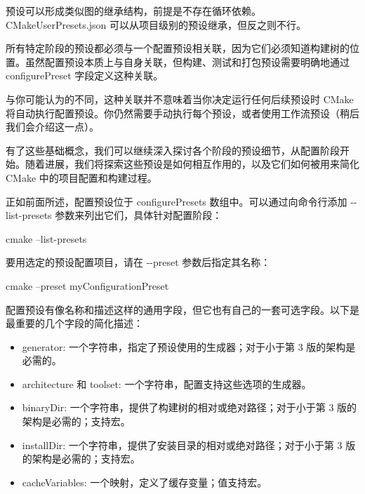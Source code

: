 预设可以形成类似图的继承结构，前提是不存在循环依赖。CMakeUserPresets.json 可以从项目级别的预设继承，但反之则不行。


所有特定阶段的预设都必须与一个配置预设相关联，因为它们必须知道构建树的位置。虽然配置预设本质上与自身关联，但构建、测试和打包预设需要明确地通过 configurePreset 字段定义这种关联。

与你可能认为的不同，这种关联并不意味着当你决定运行任何后续预设时 CMake 将自动执行配置预设。你仍然需要手动执行每个预设，或者使用工作流预设（稍后我们会介绍这一点）。

有了这些基础概念，我们可以继续深入探讨各个阶段的预设细节，从配置阶段开始。随着进展，我们将探索这些预设是如何相互作用的，以及它们如何被用来简化 CMake 中的项目配置和构建过程。


正如前面所述，配置预设位于 configurePresets 数组中。可以通过向命令行添加 -{}-list-presets 参数来列出它们，具体针对配置阶段：

\begin{shell}
cmake --list-presets
\end{shell}

要用选定的预设配置项目，请在 -{}-preset 参数后指定其名称：

\begin{shell}
cmake --preset myConfigurationPreset
\end{shell}

配置预设有像名称和描述这样的通用字段，但它也有自己的一套可选字段。以下是最重要的几个字段的简化描述：

\begin{itemize}
\item
generator: 一个字符串，指定了预设使用的生成器；对于小于第 3 版的架构是必需的。

\item
architecture 和 toolset: 一个字符串，配置支持这些选项的生成器。

\item
binaryDir: 一个字符串，提供了构建树的相对或绝对路径；对于小于第 3 版的架构是必需的；支持宏。

\item
installDir: 一个字符串，提供了安装目录的相对或绝对路径；对于小于第 3 版的架构是必需的；支持宏。

\item
cacheVariables: 一个映射，定义了缓存变量；值支持宏。
\end{itemize}

